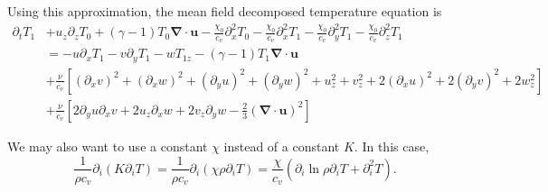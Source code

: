 \documentclass[letterpaper,12pt]{paper}
\newcommand{\lnrho}{\ensuremath{\ln \rho}}
\newcommand{\divu}{\ensuremath{\mathbf{\nabla \cdot u}}}
\begin{document}
Using this approximation, the mean field decomposed temperature
equation is 
\begin{equation}
  \label{eq:temp_mfd}
  \begin{aligned}
  \partial_t T_1 & + u_z \partial_z T_0 + (\gamma - 1) T_0 \divu  -
  \frac{\chi_0}{c_v} \partial_x^2 T_0 -
  \frac{\chi_0}{c_v} \partial_x^2 T_1 -
  \frac{\chi_0}{c_v} \partial_y^2 T_1 -
  \frac{\chi_0}{c_v} \partial_z^2 T_1\\
  & = -u \partial_x T_1 - v \partial_y T_1 - w T_{1z} - (\gamma - 1)
  T_1 \divu\\
&+ \frac{\nu}{c_v}\left[ (\partial_x v)^2 + (\partial_x w)^2 + (\partial_y
u)^2 + (\partial_y w)^2 + u_z^2 + v_z^2 + 2 (\partial_x u)^2 + 2
(\partial_y v)^2 + 2 w_z^2\right] \\
& + \frac{\nu}{c_v}\left[2 \partial_y u \partial_x v + 2 u_z \partial_x w + 2 v_z \partial_y
w - \frac{2}{3} (\divu)^2 \right]
\end{aligned}
\end{equation}

We may also want to use a constant $\chi$ instead of a constant
$K$. In this case, 
\begin{equation}
  \label{eq:constant_chi}
  \frac{1}{\rho c_v} \partial_i (K \partial_i T) = \frac{1}{\rho
    c_v} \partial_i (\chi \rho \partial_i T) = \frac{\chi}{c_v}
  \left( \partial_i \lnrho \partial_i T + \partial_i^2 T \right).
\end{equation}
\end{document}
